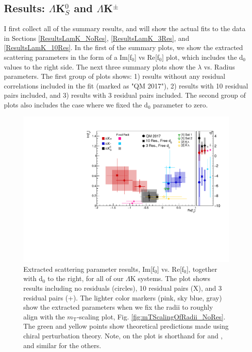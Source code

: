 \documentclass[../AnalysisNoteJBuxton.tex]{subfiles}
\begin{document}
\subsection{Results: \texorpdfstring{$\Lambda$K$^{0}_{S}$ and $\Lambda$K$^{\pm}$}{TEXT}}
\label{ResultsLamK}

I first collect all of the summary results, and will show the actual fits to the data in Sections \ref{ResultsLamK_NoRes}, \ref{ResultsLamK_3Res}, and \ref{ResultsLamK_10Res}.  In the first of the summary plots, we show the extracted scattering parameters in the form of a Im[f$_{0}$] vs Re[f$_{0}$] plot, which includes the d$_{0}$ values to the right side.  The next three summary plots show the $\lambda$ vs. Radius parameters.  The first group of plots shows: 1) results without any residual correlations included in the fit (marked as "QM 2017"), 2) results with 10 residual pairs included, and 3) results with 3 residual pairs included.  The second group of plots also includes the case where we fixed the d$_{0}$ parameter to zero.

\begin{figure}[h]
  \centering
  \includegraphics[width=\textwidth]{7_ResultsAndDiscussion/Figures/CompareAllReF0vsImF0AcrossAnalyses_10ResAnd3Res_10and3SeparateOnly_FreeD0Only_wFixedRadiiResults_wScattLenPredictions.pdf}
  \caption[Scattering Parameter Results]{Extracted scattering parameter results, Im[f$_{0}$] vs. Re[f$_{0}$], together with d$_{0}$ to the right, for all of our $\Lambda$K systems.  The plot shows results including no residuals (circles), 10 residual pairs (X), and 3 residual pairs (+).  The lighter color markers (pink, sky blue, gray) show the extracted parameters when we fix the radii to roughly align with the $m_{\mathrm{T}}$-scaling plot, Fig. \ref{fig:mTScalingOfRadii_NoRes}.  The green \cite{Liu:2006xja} and yellow \cite{Mai:2009ce} points show theoretical predictions made using chiral perturbation theory.  Note, \LamKchP on the plot is shorthand for \LamKchP and \ALamKchM, and similar for the others.}
  \label{fig:ImF0vsReF0_FreeD0Only}
\end{figure}
\end{document}
